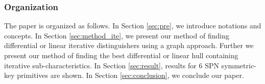 
\subsubsection{Organization}
The paper is organized as follows. In Section \ref{sec:pre}, we introduce notations and concepts. In Section \ref{sec:method_ite}, we present our method of finding differential or linear iterative distinguishers using a graph approach. Further we present our method of finding the best differential or linear hull containing iterative sub-characteristics. In Section \ref{sec:result}, results for 6 SPN symmetric-key primitives are shown. In Section \ref{sec:conclusion}, we conclude our paper.
